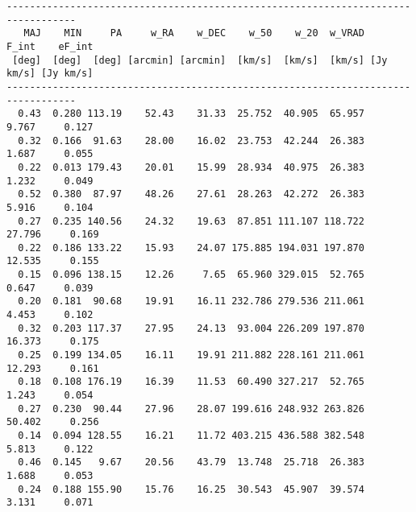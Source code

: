 {\begin{verbatim}
----------------------------------------------------------------------------------
   MAJ    MIN     PA     w_RA    w_DEC    w_50    w_20  w_VRAD     F_int    eF_int
 [deg]  [deg]  [deg] [arcmin] [arcmin]  [km/s]  [km/s]  [km/s] [Jy km/s] [Jy km/s]
----------------------------------------------------------------------------------
  0.43  0.280 113.19    52.43    31.33  25.752  40.905  65.957     9.767     0.127
  0.32  0.166  91.63    28.00    16.02  23.753  42.244  26.383     1.687     0.055
  0.22  0.013 179.43    20.01    15.99  28.934  40.975  26.383     1.232     0.049
  0.52  0.380  87.97    48.26    27.61  28.263  42.272  26.383     5.916     0.104
  0.27  0.235 140.56    24.32    19.63  87.851 111.107 118.722    27.796     0.169
  0.22  0.186 133.22    15.93    24.07 175.885 194.031 197.870    12.535     0.155
  0.15  0.096 138.15    12.26     7.65  65.960 329.015  52.765     0.647     0.039
  0.20  0.181  90.68    19.91    16.11 232.786 279.536 211.061     4.453     0.102
  0.32  0.203 117.37    27.95    24.13  93.004 226.209 197.870    16.373     0.175
  0.25  0.199 134.05    16.11    19.91 211.882 228.161 211.061    12.293     0.161
  0.18  0.108 176.19    16.39    11.53  60.490 327.217  52.765     1.243     0.054
  0.27  0.230  90.44    27.96    28.07 199.616 248.932 263.826    50.402     0.256
  0.14  0.094 128.55    16.21    11.72 403.215 436.588 382.548     5.813     0.122
  0.46  0.145   9.67    20.56    43.79  13.748  25.718  26.383     1.688     0.053
  0.24  0.188 155.90    15.76    16.25  30.543  45.907  39.574     3.131     0.071


\end{verbatim}}
